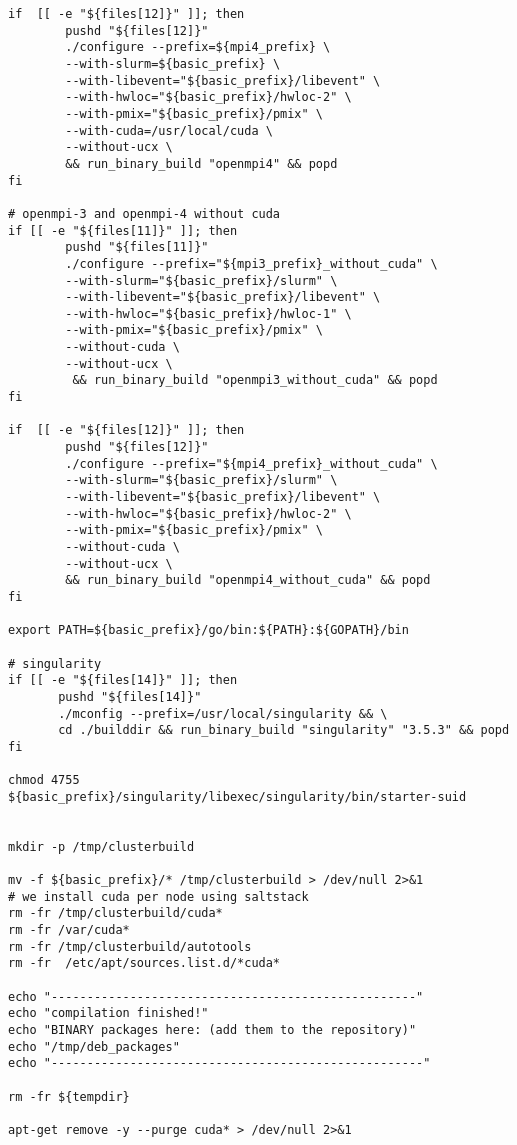 \documentclass[a4paper]{extarticle}
\begin{document}
\begin{verbatim}
if  [[ -e "${files[12]}" ]]; then
        pushd "${files[12]}"
        ./configure --prefix=${mpi4_prefix} \
        --with-slurm=${basic_prefix} \
        --with-libevent="${basic_prefix}/libevent" \
        --with-hwloc="${basic_prefix}/hwloc-2" \
        --with-pmix="${basic_prefix}/pmix" \
        --with-cuda=/usr/local/cuda \
        --without-ucx \
        && run_binary_build "openmpi4" && popd
fi

# openmpi-3 and openmpi-4 without cuda
if [[ -e "${files[11]}" ]]; then
        pushd "${files[11]}"
        ./configure --prefix="${mpi3_prefix}_without_cuda" \
        --with-slurm="${basic_prefix}/slurm" \
        --with-libevent="${basic_prefix}/libevent" \
        --with-hwloc="${basic_prefix}/hwloc-1" \
        --with-pmix="${basic_prefix}/pmix" \
        --without-cuda \
        --without-ucx \
         && run_binary_build "openmpi3_without_cuda" && popd
fi

if  [[ -e "${files[12]}" ]]; then
        pushd "${files[12]}"
        ./configure --prefix="${mpi4_prefix}_without_cuda" \
        --with-slurm="${basic_prefix}/slurm" \
        --with-libevent="${basic_prefix}/libevent" \
        --with-hwloc="${basic_prefix}/hwloc-2" \
        --with-pmix="${basic_prefix}/pmix" \
        --without-cuda \
        --without-ucx \
        && run_binary_build "openmpi4_without_cuda" && popd
fi

export PATH=${basic_prefix}/go/bin:${PATH}:${GOPATH}/bin

# singularity
if [[ -e "${files[14]}" ]]; then
       pushd "${files[14]}"
       ./mconfig --prefix=/usr/local/singularity && \
       cd ./builddir && run_binary_build "singularity" "3.5.3" && popd
fi

chmod 4755 ${basic_prefix}/singularity/libexec/singularity/bin/starter-suid


mkdir -p /tmp/clusterbuild

mv -f ${basic_prefix}/* /tmp/clusterbuild > /dev/null 2>&1
# we install cuda per node using saltstack
rm -fr /tmp/clusterbuild/cuda*
rm -fr /var/cuda*
rm -fr /tmp/clusterbuild/autotools
rm -fr  /etc/apt/sources.list.d/*cuda*

echo "---------------------------------------------------"
echo "compilation finished!"
echo "BINARY packages here: (add them to the repository)"
echo "/tmp/deb_packages"
echo "----------------------------------------------------"

rm -fr ${tempdir}

apt-get remove -y --purge cuda* > /dev/null 2>&1
\end{verbatim}
\end{document}
